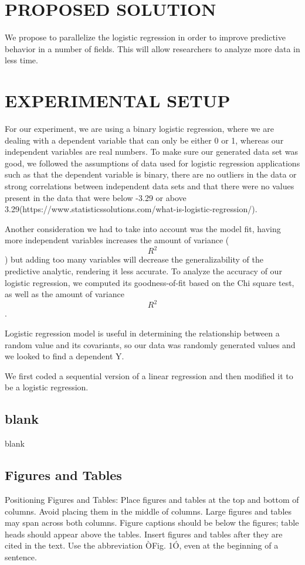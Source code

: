 \documentclass[letterpaper, 10 pt, conference]{ieeeconf}  %
\begin{document}
\section{PROPOSED SOLUTION}
We propose to parallelize the logistic regression in order to improve predictive behavior in a number of fields. This will allow researchers to analyze more data in less time. 

\section{EXPERIMENTAL SETUP}
For our experiment, we are using a binary logistic regression, where we are dealing with a dependent variable that can only be either 0 or 1, whereas our independent variables are real numbers. To make sure our generated data set was good, we followed the assumptions of data used for logistic regression applications such as that the dependent variable is binary, there are no outliers in the data or strong correlations between independent data sets and that there were no values present in the data that were below -3.29 or above 3.29(https://www.statisticssolutions.com/what-is-logistic-regression/). 

Another consideration we had to take into account was the model fit, having more independent variables increases the amount of variance ($$R^2$$) but adding too many variables will decrease the generalizability of the predictive analytic, rendering it less accurate. To analyze the accuracy of our logistic regression, we computed its goodness-of-fit based on the Chi square test, as well as the amount of variance $$R^2$$.  

Logistic regression model is useful in determining the relationship between a random value and its covariants, so our data was randomly generated values and we looked to find a dependent Y.

We first coded a sequential version of a linear regression and then modified it to be a logistic regression. 


\subsection{blank}

blank

\subsection{Figures and Tables}

Positioning Figures and Tables: Place figures and tables at the top and bottom of columns. Avoid placing them in the middle of columns. Large figures and tables may span across both columns. Figure captions should be below the figures; table heads should appear above the tables. Insert figures and tables after they are cited in the text. Use the abbreviation ÒFig. 1Ó, even at the beginning of a sentence.
\end{document}
